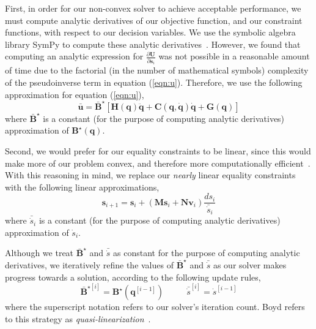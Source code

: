 First, in order for our non-convex solver to achieve acceptable performance, we must compute analytic derivatives of our objective function, and our constraint functions, with respect to our decision variables.
We use the symbolic algebra library SymPy to compute these analytic derivatives~\cite{sympy:2014}.
However, we found that computing an analytic expression for $\frac{ \partial \mathbf{U} }{ \partial \mathbf{s}_i } $ was not possible in a reasonable amount of time due to the factorial (in the number of mathematical symbols) complexity of the pseudoinverse term  in equation (\ref{eqn:u}).
Therefore, we use the following approximation for equation (\ref{eqn:u}),
%
\begin{equation}
\bar{\mathbf{u}} = \bar{\mathbf{B}}^{\star} \left[\mathbf{H}(\mathbf{q}) \ddot{\mathbf{q}} + \mathbf{C}(\mathbf{q},\dot{\mathbf{q}}) \dot{\mathbf{q}} + \mathbf{G}(\mathbf{q})\right]
\label{eqn:uhat}
\end{equation}
%
where $\bar{\mathbf{B}}^{\star}$ is a constant (for the purpose of computing analytic derivatives) approximation of $\mathbf{B}^{\star}(\mathbf{q})$.


Second, we would prefer for our equality constraints to be linear, since this would make more of our problem convex, and therefore more computationally efficient~\cite{boyd:2008}.
With this reasoning in mind, we replace our \emph{nearly} linear equality constraints with the following linear approximations,
%
\begin{equation}
\mathbf{s}_{i+1} = \mathbf{s}_{i} + (\mathbf{M}\mathbf{s}_{i} + \mathbf{N}\mathbf{v}_{i}) \frac{ds_i}{\bar{\dot{s}}_i}
\end{equation}
%
where $\bar{\dot{s}}_i$ is a constant (for the purpose of computing analytic derivatives) approximation of $\dot{s}_i$.

Although we treat $\bar{\mathbf{B}}^{\star}$ and $\bar{\dot{s}}$ as constant for the purpose of computing analytic derivatives, we iteratively refine the values of $\bar{\mathbf{B}}^{\star}$ and $\bar{\dot{s}}$ as our solver makes progress towards a solution, according to the following update rules,
%
\begin{equation}
\bar{\mathbf{B}}^{\star [i]} = \mathbf{B}^{\star}(\mathbf{q}^{[i-1]}) ~~~~~~~~~~~~ \bar{\dot{s}}^{[i]} = \dot{s}^{[i-1]}
\end{equation}
%
where the superscript notation refers to our solver's iteration count.
Boyd refers to this strategy as \emph{quasi-linearization}~.

